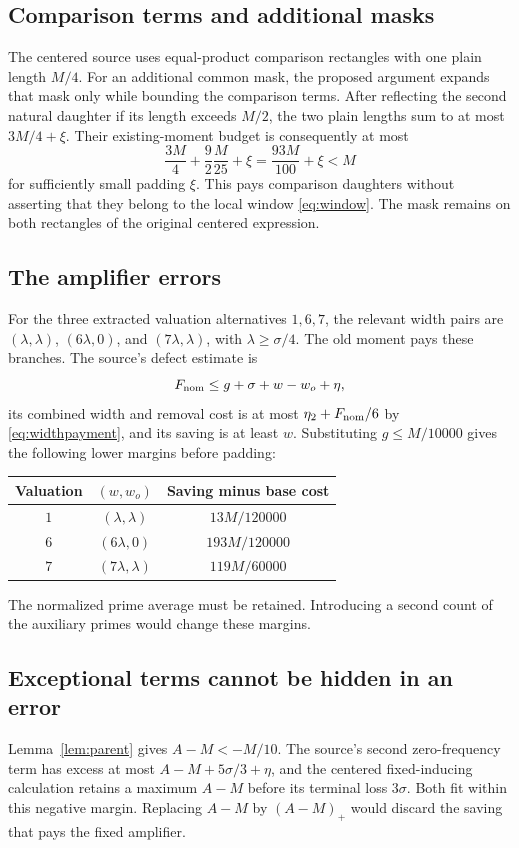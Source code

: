 \documentclass[11pt]{article}
\theoremstyle{definition}
\begin{document}
\subsection{Comparison terms and additional masks}
The centered source uses equal-product comparison rectangles with one
plain length $M/4$. For an additional common mask, the proposed argument
expands that mask only while bounding the comparison terms. After
reflecting the second natural daughter if its length exceeds $M/2$, the
two plain lengths sum to at most $3M/4+\xi$. Their existing-moment
budget is consequently at most
\[
 \frac{3M}{4}+\frac92\frac M{25}+\xi
 =\frac{93M}{100}+\xi<M
\]
for sufficiently small padding $\xi$. This pays comparison daughters
without asserting that they belong to the local window
\eqref{eq:window}. The mask remains on both rectangles of the original
centered expression.

\subsection{The amplifier errors}
For the three extracted valuation alternatives $1,6,7$, the relevant
width pairs are $(\lambda,\lambda)$, $(6\lambda,0)$, and
$(7\lambda,\lambda)$, with $\lambda\ge\sigma/4$. The old moment
pays these branches. The source's defect estimate is
\[
 F_{\rm nom}\le g+\sigma+w-w_o+\eta,
\]
its combined width and removal cost is at most
$\eta_2+F_{\rm nom}/6$ by \eqref{eq:widthpayment}, and its saving is at least
$w$. Substituting $g\le M/10000$ gives the following lower margins
before padding:
\begin{center}
\begin{tabular}{ccc}
\toprule
Valuation & $(w,w_o)$ & Saving minus base cost\\
\midrule
$1$ & $(\lambda,\lambda)$ & $13M/120000$\\
$6$ & $(6\lambda,0)$ & $193M/120000$\\
$7$ & $(7\lambda,\lambda)$ & $119M/60000$\\
\bottomrule
\end{tabular}
\end{center}
The normalized prime average must be retained. Introducing a second
count of the auxiliary primes would change these margins.

\subsection{Exceptional terms cannot be hidden in an error}
Lemma~\ref{lem:parent} gives $A-M<-M/10$. The source's second
zero-frequency term has excess at most $A-M+5\sigma/3+\eta$, and
the centered fixed-inducing calculation retains a maximum $A-M$ before
its terminal loss $3\sigma$. Both fit within this negative margin.
Replacing $A-M$ by $(A-M)_+$ would discard the saving that pays the
fixed amplifier.
\end{document}
